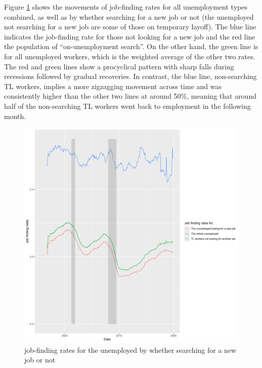 \documentclass[a4paper, 11pt, tikz]{article}
\begin{document}
Figure \ref{finding_rates_by_search} shows the movements of job-finding rates for all unemployment types combined, as well as by whether searching for a new job or not (the unemployed not searching for a new job are some of those on temporary layoff).
The blue line indicates the job-finding rate for those not looking for a new job and the red line the population of ``on-unemployment search''.
On the other hand, the green line is for all unemployed workers, which is the weighted average of the other two rates.
The red and green lines show a procyclical pattern with sharp falls during recessions followed by gradual recoveries.
In contrast, the blue line, non-searching TL workers, implies a more zigzagging movement across time and was consistently higher than the other two lines at around 50\%, meaning that around half of the non-searching TL workers went back to employment in the following month.

\begin{figure}
  \centering
  \includegraphics[width=150mm]{finding_rates_by_search.pdf}
  \caption{job-finding rates for the unemployed by whether searching for a new job or not}
  \label{finding_rates_by_search}
\end{figure}
\end{document}
